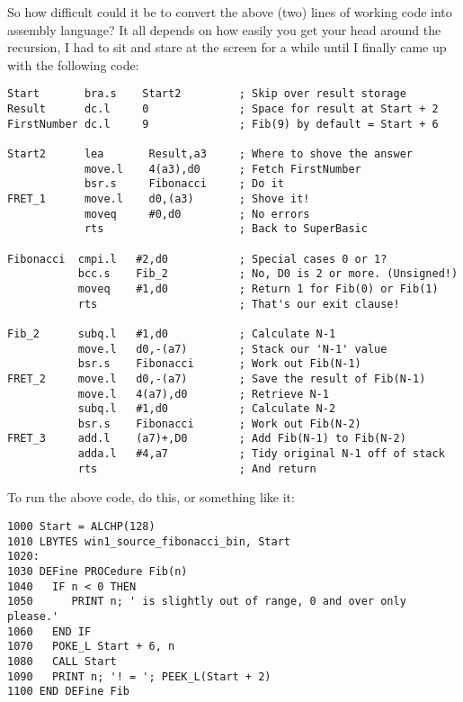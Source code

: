 So how difficult could it be to convert the above (two) lines of
      working code into assembly language? It all depends on how easily you
      get your head around the recursion, I had to sit and stare at the screen
      for a while until I finally came up with the following code:

\begin{lstlisting}[firstnumber=1,caption={Recursive Fibonacci Program}]
Start       bra.s    Start2         ; Skip over result storage
Result      dc.l     0              ; Space for result at Start + 2
FirstNumber dc.l     9              ; Fib(9) by default = Start + 6

Start2      lea       Result,a3     ; Where to shove the answer
            move.l    4(a3),d0      ; Fetch FirstNumber
            bsr.s     Fibonacci     ; Do it
FRET_1      move.l    d0,(a3)       ; Shove it!
            moveq     #0,d0         ; No errors
            rts                     ; Back to SuperBasic

Fibonacci  cmpi.l   #2,d0           ; Special cases 0 or 1?
           bcc.s    Fib_2           ; No, D0 is 2 or more. (Unsigned!)
           moveq    #1,d0           ; Return 1 for Fib(0) or Fib(1)
           rts                      ; That's our exit clause!

Fib_2      subq.l   #1,d0           ; Calculate N-1
           move.l   d0,-(a7)        ; Stack our 'N-1' value
           bsr.s    Fibonacci       ; Work out Fib(N-1)
FRET_2     move.l   d0,-(a7)        ; Save the result of Fib(N-1)
           move.l   4(a7),d0        ; Retrieve N-1
           subq.l   #1,d0           ; Calculate N-2
           bsr.s    Fibonacci       ; Work out Fib(N-2)
FRET_3     add.l    (a7)+,D0        ; Add Fib(N-1) to Fib(N-2)
           adda.l   #4,a7           ; Tidy original N-1 off of stack
           rts                      ; And return
\end{lstlisting}

To run the above code, do this, or something like it:

\begin{lstlisting}[firstnumber=1,language={}]
1000 Start = ALCHP(128)
1010 LBYTES win1_source_fibonacci_bin, Start
1020:
1030 DEFine PROCedure Fib(n)
1040   IF n < 0 THEN
1050      PRINT n; ' is slightly out of range, 0 and over only please.'
1060   END IF
1070   POKE_L Start + 6, n
1080   CALL Start
1090   PRINT n; '! = '; PEEK_L(Start + 2)
1100 END DEFine Fib
\end{lstlisting}

